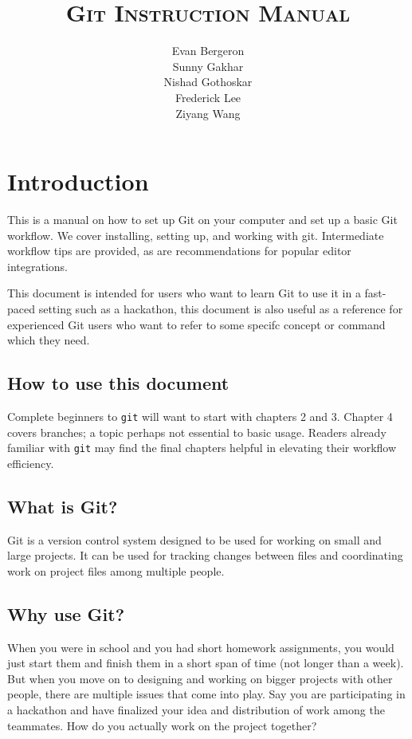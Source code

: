 \documentclass[12pt]{report}
\title{\scshape Git Instruction Manual}
\author{Evan Bergeron\\
Sunny Gakhar\\
Nishad Gothoskar\\
Frederick Lee\\
Ziyang Wang
}
\begin{document}
{\sffamily \maketitle }

\tableofcontents
\newpage
\chapter{Introduction}

This is a manual on how to set up Git on your computer and set up a basic Git workflow. We cover installing, setting up, and working with git. Intermediate workflow tips are provided, as are recommendations for popular editor integrations.

This document is intended for users who want to learn Git to use it in a fast-paced setting such as a hackathon, this document is also useful as a reference for experienced Git users who want to refer to some specifc concept or command which they need.

\section{How to use this document}

Complete beginners to \texttt{git} will want to start with chapters 2 and 3. Chapter 4 covers branches; a topic perhaps not essential to basic usage. Readers already familiar with \texttt{git} may find the final chapters helpful in elevating their workflow efficiency.

\section{What is Git?}

Git is a version control system designed to be used for working on small and large projects. It can be used for tracking changes between files and coordinating work on project files among multiple people.

\section{Why use Git?}
When you were in school and you had short homework assignments, you would just start them and finish them in a short span of time (not longer than a week). But when you move on to designing and working on bigger projects with other people, there are multiple issues that come into play. Say you are participating in a hackathon and have finalized your idea and distribution of work among the teammates. How do you actually work on the project together? 
\end{document}

